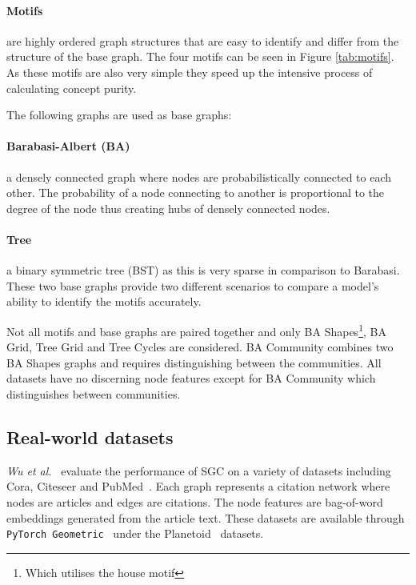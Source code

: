 \paragraph{Motifs}

are highly ordered graph structures that are easy to identify and differ from the structure of the base graph.
The four motifs can be seen in Figure \ref{tab:motifs}.
As these motifs are also very simple they speed up the intensive process of calculating concept purity.

The following graphs are used as base graphs:

\paragraph{Barabasi-Albert (BA)}
a densely connected graph where nodes are probabilistically connected to each other.
The probability of a node connecting to another is proportional to the degree of the node thus creating hubs of densely connected nodes.

\paragraph{Tree}
a binary symmetric tree (BST) as this is very sparse in comparison to Barabasi.
These two base graphs provide two different scenarios to compare a model's ability to identify the motifs accurately.

Not all motifs and base graphs are paired together and only BA Shapes\footnote{Which utilises the house motif}, BA Grid, Tree Grid and Tree Cycles are considered.
BA Community combines two BA Shapes graphs and requires distinguishing between the communities.
All datasets have no discerning node features except for BA Community which distinguishes between communities.

\subsection{Real-world datasets}
\label{sec:RWD}


\textit{Wu et al.}~\cite{wu2019simplifying} evaluate the performance of SGC on a variety of datasets including Cora, Citeseer and PubMed~\cite{citation}.
Each graph represents a citation network where nodes are articles and edges are citations.
The node features are bag-of-word embeddings generated from the article text.
These datasets are available through \texttt{PyTorch Geometric}~\cite{Fey/Lenssen/2019} under the Planetoid~\cite{planetoid} datasets.

